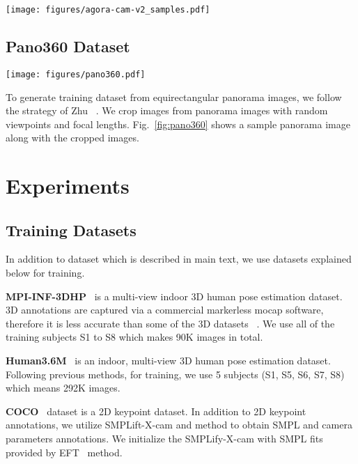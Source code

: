 \documentclass[10pt,twocolumn,letterpaper,usenames,dvipsnames]{article}
\begin{document}
\begin{figure*}
    \centering
    \texttt{[image: figures/agora-cam-v2\_samples.pdf]}
    \caption{\textbf{\agoracam dataset samples.}}
    \label{fig:agora-cam-samples}
\end{figure*}

\subsection{Pano360 Dataset}

\begin{figure*}
    \centering
    \texttt{[image: figures/pano360.pdf]}
    \caption{\textbf{Pano360 dataset.} Random viewpoints (b) from a single equirectangular panorama image (a). Horizon annotations are shown in red line.}
    \label{fig:pano360}
\end{figure*}

To generate training dataset from equirectangular panorama images, we follow the strategy of Zhu \etal~\cite{zhu2020single}. We crop images from panorama images with random viewpoints and focal lengths. Fig.~\ref{fig:pano360} shows a sample panorama image along with the cropped images. 

\section{Experiments}


\subsection{Training Datasets}

In addition to \agoracam dataset which is described in main text, we use datasets explained below for training.

\noindent\textbf{MPI-INF-3DHP}~\cite{mpiiinf3dhp_mono-2017} is a multi-view indoor 3D human pose estimation dataset. 3D annotations are captured via a commercial markerless mocap software, therefore it is less accurate than some of the 3D datasets \eg \hthreesixm~\cite{ionescu_h36m}. We use all of the training subjects S1 to S8 which makes 90K images in total.

\noindent\textbf{Human3.6M}~\cite{ionescu_h36m} is an indoor, multi-view 3D human pose estimation dataset. Following previous methods, for training, we use 5 subjects (S1, S5, S6, S7, S8) which means 292K images.

\noindent\textbf{COCO}~\cite{coco} dataset is a 2D keypoint dataset. In addition to 2D keypoint annotations, we utilize SMPLift-X-cam and \camcalib method to obtain SMPL and camera parameters annotations. We initialize the SMPLify-X-cam with SMPL fits provided by EFT~\cite{joo2020eft} method.
\end{document}
